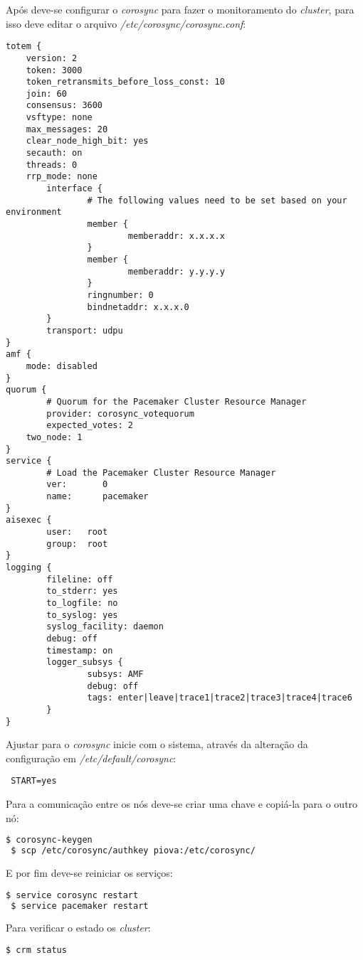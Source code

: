 Após deve-se configurar o \textit{corosync} para fazer o monitoramento do \textit{cluster}, para isso deve editar o arquivo 
\textit{/etc/corosync/corosync.conf}:
\begin{lstlisting}
totem {
	version: 2
	token: 3000
	token_retransmits_before_loss_const: 10
	join: 60
	consensus: 3600
	vsftype: none
	max_messages: 20
	clear_node_high_bit: yes
 	secauth: on
 	threads: 0
 	rrp_mode: none
        interface {
                # The following values need to be set based on your environment 
                member {
                        memberaddr: x.x.x.x
                }
                member {
                        memberaddr: y.y.y.y
                }
                ringnumber: 0
                bindnetaddr: x.x.x.0
        }
        transport: udpu
}
amf {
	mode: disabled
}
quorum {
        # Quorum for the Pacemaker Cluster Resource Manager
        provider: corosync_votequorum
        expected_votes: 2
	two_node: 1
}
service {
        # Load the Pacemaker Cluster Resource Manager
        ver:       0
        name:      pacemaker
}
aisexec {
        user:   root
        group:  root
}
logging {
        fileline: off
        to_stderr: yes
        to_logfile: no
        to_syslog: yes
        syslog_facility: daemon
        debug: off
        timestamp: on
        logger_subsys {
                subsys: AMF
                debug: off
                tags: enter|leave|trace1|trace2|trace3|trace4|trace6
        }
}
\end{lstlisting}

Ajustar para o \textit{corosync} inicie com o sistema, através da alteração da configuração em \textit{/etc/default/corosync}:
\begin{lstlisting}
 START=yes
\end{lstlisting}

Para a comunicação entre os nós deve-se criar uma chave e copiá-la para o outro nó:
\begin{lstlisting}[language=bash]
 $ corosync-keygen
 $ scp /etc/corosync/authkey piova:/etc/corosync/
\end{lstlisting}

E por fim deve-se reiniciar os serviços:
\begin{lstlisting}[language=bash]
 $ service corosync restart
 $ service pacemaker restart
\end{lstlisting}

Para verificar o estado os \textit{cluster}:
\begin{lstlisting}[language=bash]
 $ crm status
\end{lstlisting}

